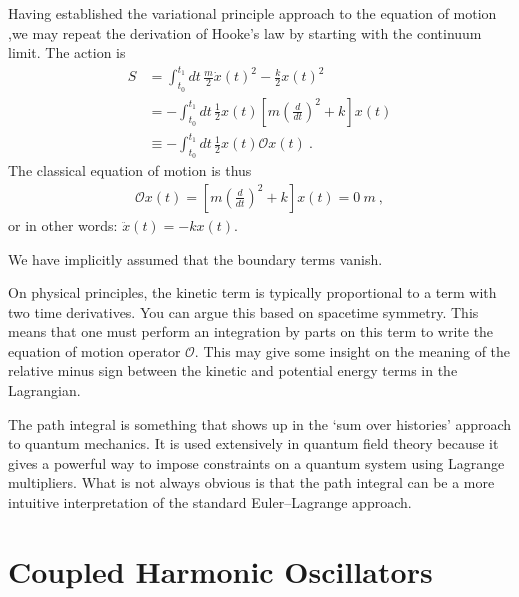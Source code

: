 \begin{example}
Having established the variational principle approach to the equation of motion ,we may repeat the derivation of Hooke's law by starting with the continuum limit. The action is
\begin{align}
    S&= \int_{t_0}^{t_1} dt\, \frac{m}{2}\dot x(t)^2 - \frac{k}{2}x(t)^2
    \\&
    = -\int_{t_0}^{t_1} dt\, \frac{1}{2}x(t)
    \left[m\left(\frac{d}{dt}\right)^2 + k\right]x(t)
    \\&    
    \equiv -\int_{t_0}^{t_1} dt\, \frac{1}{2} x(t) \mathcal O x(t) \ .
\end{align}
The classical equation of motion is thus
\begin{align}
    \mathcal Ox(t) = \left[m\left(\frac{d}{dt}\right)^2 + k\right]x(t) = 0 \ m \ ,
\end{align}
or in other words: $\ddot x(t) = -kx(t)$.
\end{example}
We have implicitly assumed that the boundary terms vanish.

On physical principles, the kinetic term is typically proportional to a term with two time derivatives. You can argue this based on spacetime symmetry. This means that one must perform an integration by parts on this term to write the equation of motion operator $\mathcal O$. This may give some insight on the meaning of the relative minus sign between the kinetic and potential energy terms in the Lagrangian. 

The path integral is something that shows up in the `sum over histories' approach to quantum mechanics. It is used extensively in quantum field theory because it gives a powerful way to impose constraints on a quantum system using Lagrange multipliers. What is not always obvious is that the path integral can be a more intuitive interpretation of the standard Euler--Lagrange approach. 


\section{Coupled Harmonic Oscillators}

